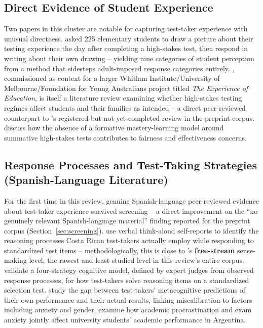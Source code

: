 \documentclass[11pt]{article}
\begin{document}
\subsection{Direct Evidence of Student Experience}

Two papers in this cluster are notable for capturing test-taker experience with unusual directness. \citet{triplett2005perceptions} asked 225 elementary students to draw a picture about their testing experience the day after completing a high-stakes test, then respond in writing about their own drawing -- yielding nine categories of student perception from a method that sidesteps adult-imposed response categories entirely. \citet{polesel2012experience}, commissioned as context for a larger Whitlam Institute/University of Melbourne/Foundation for Young Australians project titled \emph{The Experience of Education}, is itself a literature review examining whether high-stakes testing regimes affect students and their families as intended -- a direct peer-reviewed counterpart to \citet{kaleta2025studentperspectives}'s registered-but-not-yet-completed review in the preprint corpus. \citet{zimmerman2008mastery} discuss how the absence of a formative mastery-learning model around summative high-stakes tests contributes to fairness and effectiveness concerns.

\subsection{Response Processes and Test-Taking Strategies (Spanish-Language Literature)}

For the first time in this review, genuine Spanish-language peer-reviewed evidence about test-taker experience survived screening -- a direct improvement on the ``no genuinely relevant Spanish-language material'' finding reported for the preprint corpus (Section~\ref{sec:screening}). \citet{brizuela2016autorreportes} use verbal think-aloud self-reports to identify the reasoning processes Costa Rican test-takers actually employ while responding to standardized test items -- methodologically, this is close to \citeauthor{araneda2025ttxmodel}'s \textbf{free-stream} sense-making level, the rawest and least-studied level in this review's entire corpus. \citet{jimenez2018validacion} validate a four-strategy cognitive model, defined by expert judges from observed response processes, for how test-takers solve reasoning items on a standardized selection test. \citet{chacon2025simulacion} study the gap between test-takers' metacognitive predictions of their own performance and their actual results, linking miscalibration to factors including anxiety and gender. \citet{manchado2021procrastinacion} examine how academic procrastination and exam anxiety jointly affect university students' academic performance in Argentina.
\end{document}
